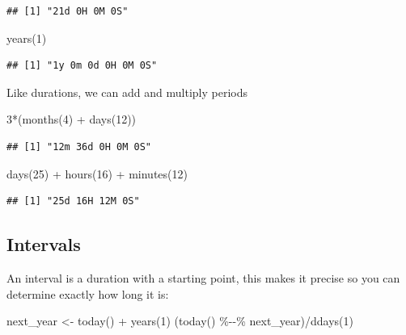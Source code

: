 \documentclass[
]{book}
\newenvironment{Shaded}{\begin{snugshade}}{\end{snugshade}}
\newcommand{\DecValTok}[1]{\textcolor[rgb]{0.00,0.00,0.81}{#1}}
\newcommand{\FunctionTok}[1]{\textcolor[rgb]{0.00,0.00,0.00}{#1}}
\newcommand{\NormalTok}[1]{#1}
\newcommand{\OtherTok}[1]{\textcolor[rgb]{0.56,0.35,0.01}{#1}}
\newcommand{\SpecialCharTok}[1]{\textcolor[rgb]{0.00,0.00,0.00}{#1}}
\begin{document}
\begin{verbatim}
## [1] "21d 0H 0M 0S"
\end{verbatim}

\begin{Shaded}
\begin{Highlighting}[]
\FunctionTok{years}\NormalTok{(}\DecValTok{1}\NormalTok{)}
\end{Highlighting}
\end{Shaded}

\begin{verbatim}
## [1] "1y 0m 0d 0H 0M 0S"
\end{verbatim}

Like durations, we can add and multiply periods

\begin{Shaded}
\begin{Highlighting}[]
\DecValTok{3}\SpecialCharTok{*}\NormalTok{(}\FunctionTok{months}\NormalTok{(}\DecValTok{4}\NormalTok{) }\SpecialCharTok{+} \FunctionTok{days}\NormalTok{(}\DecValTok{12}\NormalTok{))}
\end{Highlighting}
\end{Shaded}

\begin{verbatim}
## [1] "12m 36d 0H 0M 0S"
\end{verbatim}

\begin{Shaded}
\begin{Highlighting}[]
\FunctionTok{days}\NormalTok{(}\DecValTok{25}\NormalTok{) }\SpecialCharTok{+} \FunctionTok{hours}\NormalTok{(}\DecValTok{16}\NormalTok{) }\SpecialCharTok{+} \FunctionTok{minutes}\NormalTok{(}\DecValTok{12}\NormalTok{)}
\end{Highlighting}
\end{Shaded}

\begin{verbatim}
## [1] "25d 16H 12M 0S"
\end{verbatim}

\hypertarget{intervals}{%
\subsection{Intervals}\label{intervals}}

An interval is a duration with a starting point, this makes it precise so you can determine exactly how long it is:

\begin{Shaded}
\begin{Highlighting}[]
\NormalTok{next\_year }\OtherTok{\textless{}{-}} \FunctionTok{today}\NormalTok{() }\SpecialCharTok{+} \FunctionTok{years}\NormalTok{(}\DecValTok{1}\NormalTok{)}
\NormalTok{(}\FunctionTok{today}\NormalTok{() }\SpecialCharTok{\%{-}{-}\%}\NormalTok{ next\_year)}\SpecialCharTok{/}\FunctionTok{ddays}\NormalTok{(}\DecValTok{1}\NormalTok{)}
\end{Highlighting}
\end{Shaded}
\end{document}

